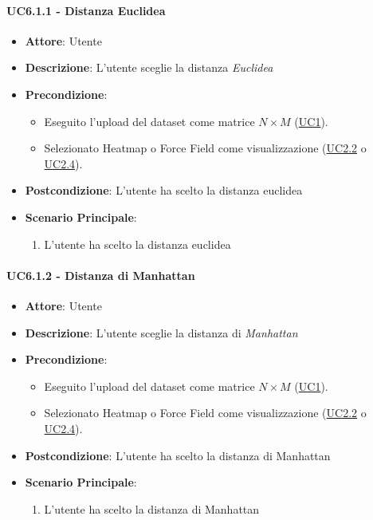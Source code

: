     \paragraph{UC6.1.1 - Distanza Euclidea}
    \label{uc6.1.1}
    \begin{itemize}
    \item \textbf{Attore}: Utente
    \item \textbf{Descrizione}: L'utente sceglie la distanza \emph{Euclidea}
    \item \textbf{Precondizione}: 
    \begin{itemize}
        \item Eseguito l'upload del dataset come matrice $N\times M$ (\hyperref[uc1]{UC1}).
        \item Selezionato Heatmap o Force Field come visualizzazione (\hyperref[uc2.2]{UC2.2} o \hyperref[uc2.4]{UC2.4}).
    \end{itemize}  
    \item \textbf{Postcondizione}: L'utente ha scelto la distanza euclidea
    \item \textbf{Scenario Principale}: 
    \begin{enumerate}
        \item L'utente ha scelto la distanza euclidea
    \end{enumerate}
    \end{itemize}
    
    \paragraph{UC6.1.2 - Distanza di Manhattan}
    \label{uc6.1.2}
    \begin{itemize}
    \item \textbf{Attore}: Utente
    \item \textbf{Descrizione}: L'utente sceglie la distanza di \emph{Manhattan}
    \item \textbf{Precondizione}: 
    \begin{itemize}
        \item Eseguito l'upload del dataset come matrice $N\times M$ (\hyperref[uc1]{UC1}).
        \item Selezionato Heatmap o Force Field come visualizzazione (\hyperref[uc2.2]{UC2.2} o \hyperref[uc2.4]{UC2.4}).
    \end{itemize}  
    \item \textbf{Postcondizione}: L'utente ha scelto la distanza di Manhattan
    \item \textbf{Scenario Principale}: 
    \begin{enumerate}
        \item L'utente ha scelto la distanza di Manhattan
    \end{enumerate}
    \end{itemize}